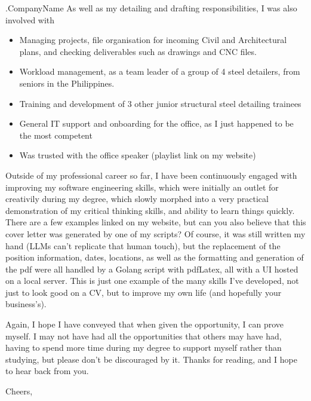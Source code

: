 \documentclass[10pt]{letter}
\begin{document}
\begin{letter}{
    {{ .CompanyName }}
}
As well as my detailing and drafting responsibilities, I was also involved with 
\begin{itemize} 
    \item Managing projects, file organisation for incoming Civil and Architectural plans, and checking deliverables such as drawings and CNC files. 
    \item Workload management, as a team leader of a group of 4 steel detailers, from seniors in the Philippines. 
    \item Training and development of 3 other junior structural steel detailing trainees 
    \item General IT support and onboarding for the office, as I just happened to be the most competent 
    \item Was trusted with the office speaker (playlist link on my website)
\end{itemize}

Outside of my professional career so far, I have been continuously engaged with improving my software engineering skills, which were initially an outlet for creativily during my degree, which slowly morphed into a very practical demonstration of my critical thinking skills, and ability to learn things quickly. There are a few examples linked on my website, but can you also believe that this cover letter was generated by one of my scripts? Of course, it was still written my hand (LLMs can't replicate that human touch), but the replacement of the position information, dates, locations, as well as the formatting and generation of the pdf were all handled by a Golang script with pdfLatex, all with a UI hosted on a local server. This is just one example of the many skills I've developed, not just to look good on a CV, but to improve my own life (and hopefully your business's). 

Again, I hope I have conveyed that when given the opportunity, I can prove myself. I may not have had all the opportunities that others may have had, having to spend more time during my degree to support myself rather than studying, but please don't be discouraged by it. Thanks for reading, and I hope to hear back from you. 


\closing{Cheers,}

\end{letter}
\end{document}
